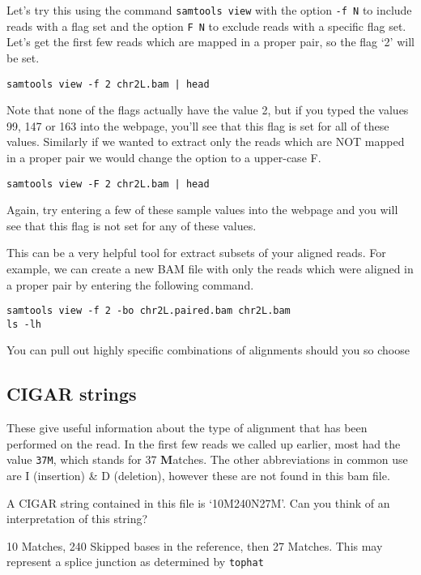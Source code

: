 \begin{steps}
Let's try this using the command \texttt{samtools view} with the option \texttt{-f N} to include reads with a flag set and the option \texttt{F N} to exclude reads with a specific flag set.
Let's get the first few reads which are mapped in a proper pair, so the flag `2' will be set.\\
\begin{lstlisting}
samtools view -f 2 chr2L.bam | head
\end{lstlisting}
Note that none of the flags actually have the value 2, but if you typed the values 99, 147 or 163 into the webpage, you'll see that this flag is set for all of these values.
Similarly if we wanted to extract only the reads which are NOT mapped in a proper pair we would change the option to a upper-case F.
\begin{lstlisting}
samtools view -F 2 chr2L.bam | head
\end{lstlisting}
Again, try entering a few of these sample values into the webpage and you will see that this flag is not set for any of these values.
\end{steps}

\begin{information}
This can be a very helpful tool for extract subsets of your aligned reads.
For example, we can create a new BAM file with only the reads which were aligned in a proper pair by entering the following command.
\begin{lstlisting}
samtools view -f 2 -bo chr2L.paired.bam chr2L.bam
ls -lh
\end{lstlisting}
You can pull out highly specific combinations of alignments should you so choose
\end{information}

\subsection{CIGAR strings}
\begin{note}
These give useful information about the type of alignment that has been performed on the read.
In the first few reads we called up earlier, most had the value \texttt{37M}, which stands for 37 \textbf{M}atches.
The other abbreviations in common use are I (insertion) \& D (deletion), however these are not found in this bam file.
\end{note}

\begin{questions}
A CIGAR string contained in this file is `10M240N27M'.
Can you think of an interpretation of this string? \\
\begin{answer}
10 Matches, 240 Skipped bases in the reference, then 27 Matches.
This may represent a splice junction as determined by \texttt{tophat}
\end{answer}
\end{questions}

